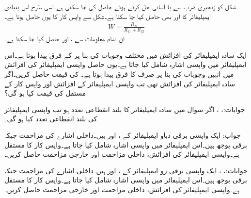 شکل  کو زنجیری ضرب سے با آسانی حل کرتے ہوئے  حاصل کی جا سکتی ہے۔اسی  طرح اس بنیادی ایمپلیفائر کا  اور  بھی حاصل کیا جا سکتا ہے۔شکل سے واپس کار کا  یوں حاصل ہوتا ہے۔
\begin{align}\label{مساوات_واپسی_زنجیری_ایمپلیفائر}
W=\frac{R_{f1}}{R_{f1}+R_{f2}}
\end{align}
ان تمام معلومات سے ،  اور  حاصل کیا جا سکتا ہے۔

\newpage
{}

ایک سادہ ایمپلیفائر کی افزائش میں مختلف وجوہات کی بنا پر  کے فرق پیدا ہوتا ہے۔اس ایمپلیفائر میں واپسی اشارہ شامل کیا جاتا ہے۔یوں حاصل واپسی ایمپلیفائر کی افزائش میں انہیں وجوہات کی بنا پر صرف  کا فرق پیدا ہوتا ہے۔ کی قیمت حاصل کریں۔اگر سادہ ایمپلیفائر کی افزائش  تھی تب واپسی ایمپلیفائر کے افزائش اور واپس کار کے مستقل   کی قیمت کیا ہو گی؟

جوابات:، ، 
اگر سوال  میں سادہ ایمپلیفائر کا بلند انقطاعی تعدد  ہو تب واپسی ایمپلیفائر کی بلند انقطاعی تعدد کیا ہو گی۔

جواب:
ایک واپسی برقی دباو ایمپلیفائر کے ،  اور  ہیں۔داخلی اشارے کی مزاحمت  جبکہ برقی بوجھ  ہیں۔اس ایمپلیفائر میں واپسی اشارہ شامل کیا جاتا ہے۔واپس کار کا مستقل  ہے۔واپسی ایمپلیفائر کی افزائش، داخلی مزاحمت اور خارجی مزاحمت حاصل کریں۔

جوابات:، ،   
ایک واپسی برقی رو ایمپلیفائر کے ،  اور
  ہیں۔داخلی اشارے کی مزاحمت  جبکہ برقی بوجھ  ہیں۔اس ایمپلیفائر میں واپسی اشارہ شامل کیا جاتا ہے۔واپس کار کا مستقل  ہے۔واپسی ایمپلیفائر کی افزائش، داخلی مزاحمت اور خارجی مزاحمت حاصل کریں۔

